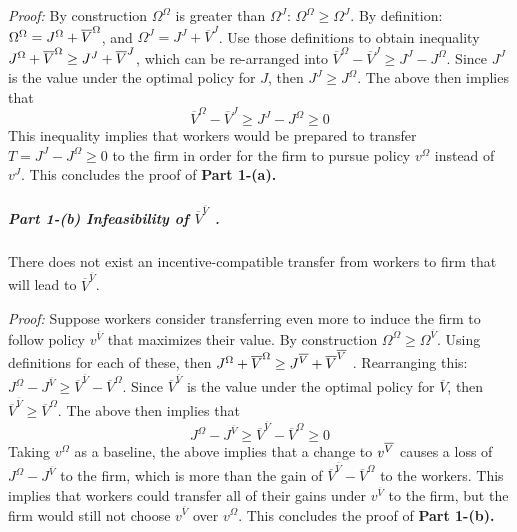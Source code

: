 \textit{Proof:} By construction $\Omega^{\Omega}$ is greater than $\Omega^{J}
$: $\Omega^{\Omega}\geq\Omega^{J}$. By definition: $\Omega^{\Omega}=J^{%
\Omega}+\overline{V}^{\Omega}$, and $\Omega^{J}=J^{J}+\overline{V}^{J}$. Use those
definitions to obtain inequality $J^{\Omega}+\overline{V}^{\Omega} \geq J^{J}+\overline{%
V}^{J}$, which can be re-arranged into $\overline{V}^{\Omega}-\overline{V}^{J} \geq
J^{J}-J^{\Omega} $. Since $J^{J}$ is the value under the optimal policy for $%
J$, then $J^{J}\geq J^{\Omega}$. The above then implies that
\begin{equation*}
\overline{V}^{\Omega}-\overline{V}^{J}\geq J^{J}-J^{\Omega}\geq0
\end{equation*}
This inequality implies that workers would be prepared to transfer $T=J^{J}-J^{\Omega}
\geq 0$ to the firm in order for the firm to pursue policy $v^{\Omega}$
instead of $v^{J}$. This concludes the proof of \textbf{Part 1-(a).}

\subparagraph{Part 1-(b) Infeasibility of $\overline{V}^{\overline{V}}$ .}

There does not exist an incentive-compatible transfer from workers to firm
that will lead to $\overline{V}^{\overline{V}}$.\newline

\textit{Proof:} Suppose workers consider transferring even more to induce
the firm to follow policy $v^{\overline{V}}$ that maximizes their value. By
construction $\Omega^{\Omega}\geq\Omega^{\overline{V}}$. Using definitions for
each of these, then $J^{\Omega}+\overline{V}^{\Omega}\geq J^{\overline{V}}+\overline{V}^{%
\overline{V}}$ . Rearranging this: $ J^{\Omega}-J^{\overline{V}}\geq\overline{V}^{\overline{V}}-%
\overline{V}^{\Omega}$. Since $\overline{V}^{\overline{V}}$ is the value under the optimal
policy for $\overline{V}$, then $\overline{V}^{\overline{V}}\geq\overline{V}^{\Omega}$. The
above then implies that
\begin{equation*}
J^{\Omega}-J^{\overline{V}}\geq\overline{V}^{\overline{V}}-\overline{V}^{\Omega}\geq0
\end{equation*}
Taking $v^{\Omega}$ as a baseline, the above implies that a change to $v^{%
\overline{V}}$ causes a loss of $J^{\Omega}-J^{\overline{V}}$ to the firm, which is
more than the gain of $\overline{V}^{\overline{V}}-\overline{V}^{\Omega}$ to the workers.
This implies that workers could transfer all of their gains under $v^{\overline{V}}$ to the
firm, but the firm would still not choose $v^{\overline{V}}$ over $v^{\Omega}$.
This concludes the proof of \textbf{Part 1-(b).}

